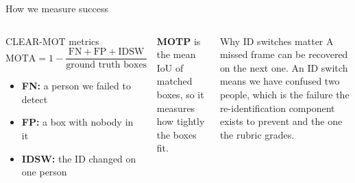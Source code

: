 \documentclass[aspectratio=169,11pt]{beamer}
\begin{document}
\begin{frame}{How we measure success}
  \begin{columns}[T,onlytextwidth]
      \begin{block}{CLEAR-MOT metrics}
        \vspace{-0.5em}
        \[ \mathrm{MOTA} = 1 - \frac{\mathrm{FN} + \mathrm{FP} + \mathrm{IDSW}}{\text{ground truth boxes}} \]
        \vspace{-0.6em}
        \begin{itemize}\footnotesize
          \item \textbf{FN:} a person we failed to detect
          \item \textbf{FP:} a box with nobody in it
          \item \textbf{IDSW:} the ID changed on one person
        \end{itemize}
      \end{block}
      \vspace{0.2em}
      {\footnotesize \textbf{MOTP} is the mean IoU of matched boxes, so it
      measures how tightly the boxes fit.}
      \begin{block}{Why ID switches matter}
        A missed frame can be recovered on the next one. An ID switch means we
        have confused two people, which is the failure the re-identification
        component exists to prevent and the one the rubric grades.
      \end{block}
  \end{columns}
\end{frame}
\end{document}
